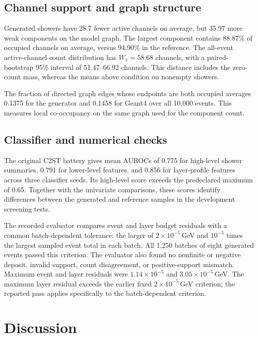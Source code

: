 \documentclass[11pt]{article}
\begin{document}
\subsection{Channel support and graph structure}

Generated showers have 28.7 fewer active channels on average, but 35.97 more weak components on the model graph. The largest component contains 88.87\% of occupied channels on average, versus 94.90\% in the reference. The all-event active-channel-count distribution has $W_1=58.68$ channels, with a paired-bootstrap 95\% interval of 51.47--66.92 channels. This distance includes the zero-count mass, whereas the means above condition on nonempty showers.

The fraction of directed graph edges whose endpoints are both occupied averages 0.1375 for the generator and 0.1458 for Geant4 over all 10,000 events. This measures local co-occupancy on the same graph used for the component count.

\subsection{Classifier and numerical checks}

The original C2ST battery gives mean AUROCs of 0.775 for high-level shower summaries, 0.791 for lower-level features, and 0.856 for layer-profile features across three classifier seeds. Its high-level score exceeds the predeclared maximum of 0.65. Together with the univariate comparisons, these scores identify differences between the generated and reference samples in the development screening tests.

The recorded evaluator compares event and layer budget residuals with a common batch-dependent tolerance: the larger of $2\times10^{-5}$\,GeV and $10^{-5}$ times the largest sampled event total in each batch. All 1,250 batches of eight generated events passed this criterion. The evaluator also found no nonfinite or negative deposit, invalid support, count disagreement, or positive-support mismatch. Maximum event and layer residuals were $1.14\times10^{-5}$ and $3.05\times10^{-5}$\,GeV. The maximum layer residual exceeds the earlier fixed $2\times10^{-5}$\,GeV criterion; the reported pass applies specifically to the batch-dependent criterion.

\section{Discussion}
\label{sec:discussion}
\end{document}
